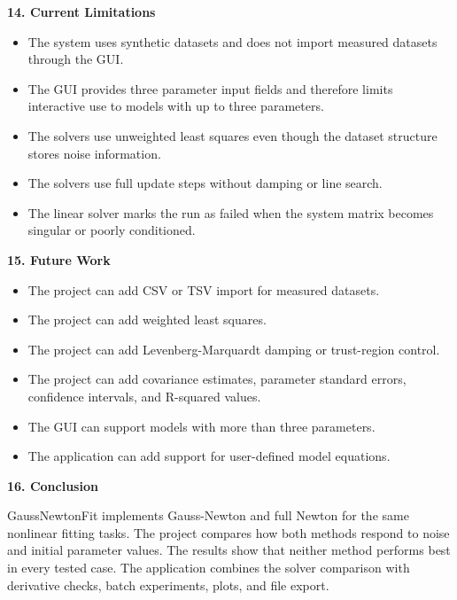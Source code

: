 \documentclass[9pt,a4paper]{extarticle}
\newcommand{\Sec}[1]{\vspace{2pt}\noindent\textbf{#1}\par\vspace{2pt}}
\begin{document}
\Sec{14. Current Limitations}
\begin{itemize}
\item The system uses synthetic datasets and does not import measured datasets through the GUI.
\item The GUI provides three parameter input fields and therefore limits interactive use to models with up to three parameters.
\item The solvers use unweighted least squares even though the dataset structure stores noise information.
\item The solvers use full update steps without damping or line search.
\item The linear solver marks the run as failed when the system matrix becomes singular or poorly conditioned.
\end{itemize}

\Sec{15. Future Work}
\begin{itemize}
\item The project can add CSV or TSV import for measured datasets.
\item The project can add weighted least squares.
\item The project can add Levenberg-Marquardt damping or trust-region control.
\item The project can add covariance estimates, parameter standard errors, confidence intervals, and R-squared values.
\item The GUI can support models with more than three parameters.
\item The application can add support for user-defined model equations.
\end{itemize}

\Sec{16. Conclusion}
GaussNewtonFit implements Gauss-Newton and full Newton for the same nonlinear fitting tasks. The project compares how both methods respond to noise and initial parameter values. The results show that neither method performs best in every tested case. The application combines the solver comparison with derivative checks, batch experiments, plots, and file export.
\end{document}
